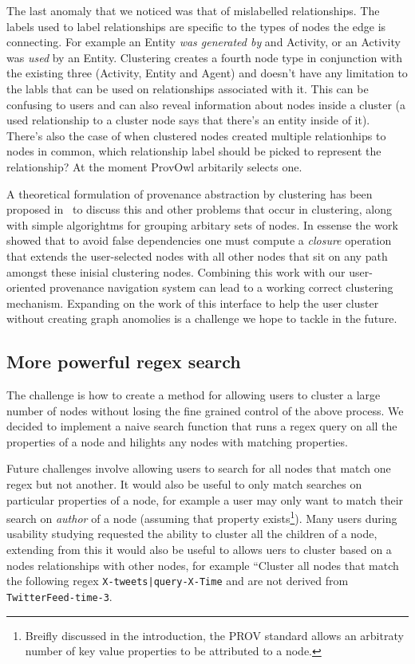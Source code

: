 The last anomaly that we noticed was that of mislabelled relationships. The labels used to label relationships are specific to the types of nodes the edge is connecting. For example an Entity \textit{was generated by} and Activity, or an Activity was \textit{used} by an Entity. Clustering creates a fourth node type in conjunction with the existing three (Activity, Entity and Agent) and doesn't have any limitation to the labls that can be used on relationships associated with it. This can be confusing to users and can also reveal information about nodes inside a cluster (a used relationship to a cluster node says that there's an entity inside of it). There's also the case of when clustered nodes created multiple relationhips to nodes in common, which relationship label should be picked to represent the relationship? At the moment ProvOwl arbitarily selects one. 

A theoretical formulation of provenance abstraction by clustering has been proposed in~\cite{Missier2014} to discuss this and other problems that occur in clustering, along with simple algorightms for grouping arbitary sets of nodes. In essense the work showed that to avoid false dependencies one must compute a \textit{closure} operation that extends the user-selected nodes with all other nodes that sit on any path amongst these inisial clustering nodes. Combining this work with our user-oriented provenance navigation system can lead to a working correct clustering mechanism. Expanding on the work of this interface to help the user cluster without creating graph anomolies is a challenge we hope to tackle in the future.

\subsection{More powerful regex search}
\label{sec:more_powerful_regex_search}

The challenge is how to create a method for allowing users to cluster a large number of nodes without losing the fine grained control of the above process. We decided to implement a naive search function that runs a regex query on all the properties of a node and hilights any nodes with matching properties.

Future challenges involve allowing users to search for all nodes that match one regex but not another. It would also be useful to only match searches on particular properties of a node, for example a user may only want to match their search on \textit{author} of a node (assuming that property exists\footnote{Breifly discussed in the introduction, the PROV standard allows an arbitraty number of key value properties to be attributed to a node.}). Many users during usability studying requested the ability to cluster all the children of a node, extending from this it would also be useful to allows uers to cluster based on a nodes relationships with other nodes, for example ``Cluster all nodes that match the following regex \texttt{X-tweets|query-X-Time} and are not derived from \texttt{TwitterFeed-time-3}.


